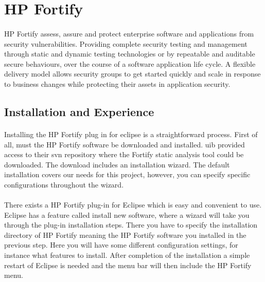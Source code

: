 \documentclass[11pt,english,a4paper]{report}
\begin{document}
\newpage

\section{HP Fortify}
\paragraph{}
HP Fortify assess, assure and protect enterprise software and applications from security vulnerabilities.
Providing complete security testing and management through static and dynamic testing technologies or by repeatable and auditable secure behaviours, over the course of a software application life cycle. 
A flexible delivery model allows security groups to get started quickly and scale in response to business changes while protecting their assets in application security.  


\subsection{Installation and Experience}
\paragraph{}
Installing the HP Fortify plug in for eclipse is a straightforward process. 
First of all, must the HP Fortify software be downloaded and installed.
\gls{uib} provided access to their \gls{svn} repository where the Fortify static analysis tool could be downloaded.  
The download includes an installation wizard. 
The default installation covers our needs for this project, however, you can specify specific configurations throughout the wizard.

\paragraph{}
There exists a HP Fortify plug-in for Eclipse which is easy and convenient to use.
Eclipse has a feature called install new software, where a wizard will take you through the plug-in installation steps.
There you have to specify the installation directory of HP Fortify meaning the HP Fortify software you installed in the previous step.
Here you will have some different configuration settings, for instance what features to install.
After completion of the installation a simple restart of Eclipse is needed and the menu bar will then include the HP Fortify menu.

\paragraph{}
\end{document}
